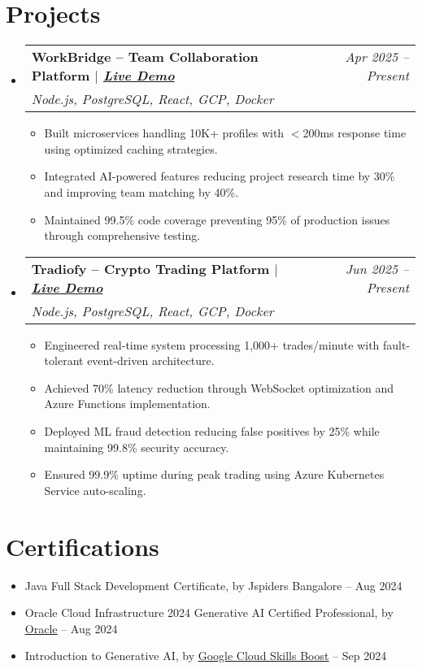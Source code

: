 \documentclass[letterpaper,11pt]{article}
\makeatletter
\newcommand{\resumeItem}[1]{
  \item\small{
    {#1 \vspace{-2pt}}
  }
}
\newcommand{\resumeProjectHeading}[3]{
    \item
    \begin{tabular*}{0.97\textwidth}[t]{l@{\extracolsep{\fill}}r}
      \textbf{#1} & \textit{\small #2} \\
      \textit{\small \textbf{} #3} & \\
    \end{tabular*}\vspace{-7pt}
}
\newcommand{\resumeSubHeadingListStart}{\begin{itemize}[leftmargin=0.15in, label={}]}
\newcommand{\resumeSubHeadingListEnd}{\end{itemize}}
\newcommand{\resumeItemListStart}{\begin{itemize}}
\newcommand{\resumeItemListEnd}{\end{itemize}\vspace{-5pt}}
\makeatother
\begin{document}
\section{Projects}
    \resumeSubHeadingListStart
      \resumeProjectHeading
          {WorkBridge -- Team Collaboration Platform $|$ \emph{\href{https://www.workbridgeco.com/}{Live Demo}}}
          {Apr 2025 -- Present}
          {Node.js, PostgreSQL, React, GCP, Docker}
        \resumeItemListStart
            \resumeItem{Built microservices handling 10K+ profiles with $<$200ms response time using optimized caching strategies.}
            \resumeItem{Integrated AI-powered features reducing project research time by 30\% and improving team matching by 40\%.}
            \resumeItem{Maintained 99.5\% code coverage preventing 95\% of production issues through comprehensive testing.}
        \resumeItemListEnd
      \resumeProjectHeading
          {Tradiofy -- Crypto Trading Platform $|$ \emph{\href{https://tradiofy.netlify.app/}{Live Demo}}}
          {Jun 2025 -- Present}
          {Node.js, PostgreSQL, React, GCP, Docker}
          \resumeItemListStart
             \resumeItem{Engineered real-time system processing 1,000+ trades/minute with fault-tolerant event-driven architecture.}
      \resumeItem{Achieved 70\% latency reduction through WebSocket optimization and Azure Functions implementation.}
      \resumeItem{Deployed ML fraud detection reducing false positives by 25\% while maintaining 99.8\% security accuracy.}
      \resumeItem{Ensured 99.9\% uptime during peak trading using Azure Kubernetes Service auto-scaling.}
          \resumeItemListEnd
    \resumeSubHeadingListEnd


\section{Certifications}
\begin{itemize}[leftmargin=0.15in, label={}, itemsep=0pt]
    \item  Java Full Stack Development Certificate, by Jspiders Bangalore -- Aug 2024
\item Oracle Cloud Infrastructure 2024 Generative AI Certified Professional, by 
    \underline{\textcolor{blue}{\href{https://catalog-education.oracle.com/pls/certview/sharebadge?id=2FD55AA64EF5240AFF31F10E95EB6D46DCAC92326D8E2ABB457EE7AC8C3CAF65s}{Oracle}}} -- Aug 2024
    \item Introduction to Generative AI, by 
    \underline{\textcolor{blue}{\href{https://www.cloudskillsboost.google/public_profiles/8517b357-d6bc-4c47-a892-438e14ac4996/badges/11241975?utm_medium=social&utm_source=linkedin&utm_campaign=ql-social-share}{Google Cloud Skills Boost}}} -- Sep 2024
\end{itemize}
\end{document}
